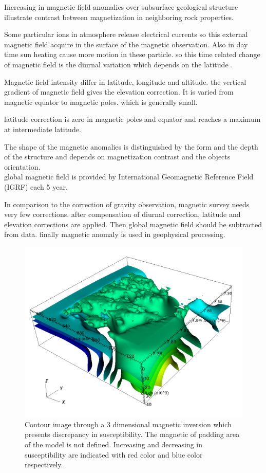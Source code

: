 Increasing in magnetic field anomalies over subsurface geological structure illustrate contrast between magnetization in neighboring rock properties.

Some particular ions in atmosphere release electrical currents so this external magnetic field acquire in the surface of the magnetic observation. Also in day time sun heating cause more motion in these particle. so this time related change of magnetic field is the diurnal variation which depends on the latitude . 

Magnetic field intensity differ in latitude, longitude and altitude. the vertical gradient of magnetic field gives the elevation correction. It is varied from magnetic equator to magnetic poles. which is generally small.

latitude correction is zero in magnetic poles and equator and reaches a maximum at intermediate latitude.

The shape of the magnetic anomalies is distinguished by the form and the depth of the structure and depends on magnetization contrast and the objects orientation.\\
global magnetic field is provided by International Geomagnetic Reference Field (IGRF) each 5 year.


In comparison to the correction of gravity observation, magnetic survey needs very few corrections. after compensation of diurnal correction, latitude and elevation corrections are applied. Then global magnetic field should be subtracted from data. finally magnetic anomaly is used in geophysical processing.

\begin{figure}
\centering
\includegraphics[width=\textwidth]{sus3Dc.png}
\caption{Contour image through a 3 dimensional magnetic inversion which presents discrepancy in susceptibility. The magnetic of padding area of the model is not defined. Increasing and decreasing in susceptibility are indicated with red color and blue color respectively.}
\end{figure}

